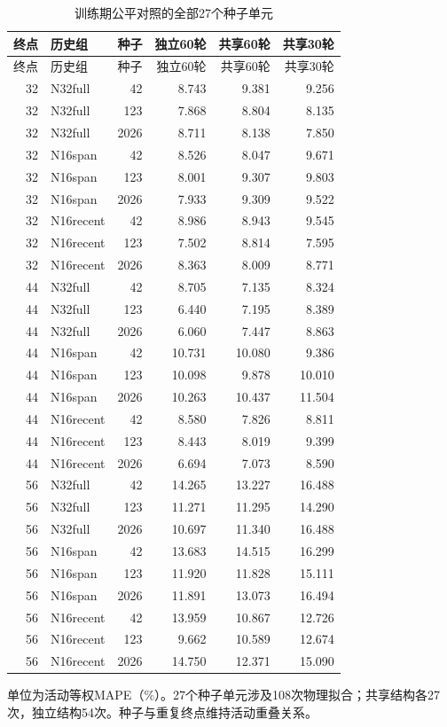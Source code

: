 \begingroup\footnotesize\setlength{\tabcolsep}{3pt}
\begin{longtable}{r p{2.5cm} r r r r}
\caption{训练期公平对照的全部27个种子单元}\label{tab:round2fairseeds}\\
\toprule
终点 & 历史组 & 种子 & 独立60轮 & 共享60轮 & 共享30轮 \\
\midrule\endfirsthead
\toprule
终点 & 历史组 & 种子 & 独立60轮 & 共享60轮 & 共享30轮 \\
\midrule\endhead
32 & N32full & 42 & 8.743 & 9.381 & 9.256 \\
32 & N32full & 123 & 7.868 & 8.804 & 8.135 \\
32 & N32full & 2026 & 8.711 & 8.138 & 7.850 \\
32 & N16span & 42 & 8.526 & 8.047 & 9.671 \\
32 & N16span & 123 & 8.001 & 9.307 & 9.803 \\
32 & N16span & 2026 & 7.933 & 9.309 & 9.522 \\
32 & N16recent & 42 & 8.986 & 8.943 & 9.545 \\
32 & N16recent & 123 & 7.502 & 8.814 & 7.595 \\
32 & N16recent & 2026 & 8.363 & 8.009 & 8.771 \\
44 & N32full & 42 & 8.705 & 7.135 & 8.324 \\
44 & N32full & 123 & 6.440 & 7.195 & 8.389 \\
44 & N32full & 2026 & 6.060 & 7.447 & 8.863 \\
44 & N16span & 42 & 10.731 & 10.080 & 9.386 \\
44 & N16span & 123 & 10.098 & 9.878 & 10.010 \\
44 & N16span & 2026 & 10.263 & 10.437 & 11.504 \\
44 & N16recent & 42 & 8.580 & 7.826 & 8.811 \\
44 & N16recent & 123 & 8.443 & 8.019 & 9.399 \\
44 & N16recent & 2026 & 6.694 & 7.073 & 8.590 \\
56 & N32full & 42 & 14.265 & 13.227 & 16.488 \\
56 & N32full & 123 & 11.271 & 11.295 & 14.290 \\
56 & N32full & 2026 & 10.697 & 11.340 & 16.488 \\
56 & N16span & 42 & 13.683 & 14.515 & 16.299 \\
56 & N16span & 123 & 11.920 & 11.828 & 15.111 \\
56 & N16span & 2026 & 11.891 & 13.073 & 16.494 \\
56 & N16recent & 42 & 13.959 & 10.867 & 12.726 \\
56 & N16recent & 123 & 9.662 & 10.589 & 12.674 \\
56 & N16recent & 2026 & 14.750 & 12.371 & 15.090 \\
\bottomrule
\end{longtable}
单位为活动等权MAPE（\%）。27个种子单元涉及108次物理拟合；共享结构各27次，独立结构54次。种子与重复终点维持活动重叠关系。\par
\endgroup
